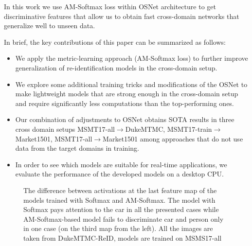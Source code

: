 \documentclass[a4paper,conference]{IEEEtran}
\begin{document}
In this work we use AM-Softmax \cite{amSoftmax} loss within OSNet
\cite{zhou2019osnet} architecture to get discriminative features that allow us
to obtain fast cross-domain networks that generalize well to unseen data.

In brief, the key contributions of this paper can be summarized as follows:

\begin{itemize}
  \item We apply the metric-learning approach (AM-Softmax \cite{amSoftmax} loss)
    to further improve generalization of re-identification models in the
    cross-domain setup.

    \item We explore some additional training tricks and modifications of the
    OSNet to make lightweight models that are strong enough in the cross-domain
    setup and require significantly less computations than the top-performing
    ones.

  \item Our combination of adjustments to OSNet obtains SOTA results in three
    cross domain setups MSMT17-all$\rightarrow$DukeMTMC,
    MSMT17-train$\rightarrow$Market1501, MSMT17-all$\rightarrow$Market1501
    among approaches that do not use data from
    the target domains in training.

  \item In order to see which models are suitable for real-time applications, we
    evaluate the performance of the developed models on a desktop CPU.

\end{itemize}

\begin{figure*}[ht]
  \centering

  \caption{The difference between activations at the last feature map of the models trained with
           Softmax and AM-Softmax. The model with Softmax pays attention to the car in all the presented cases
           while AM-Softmax-based model fails to discriminate car and person only in one case (on the third map from the left).
           All the images are taken from DukeMTMC-ReID, models are trained on MSMS17-all}
  \label{fig:actmaps}
\end{figure*}
\end{document}
